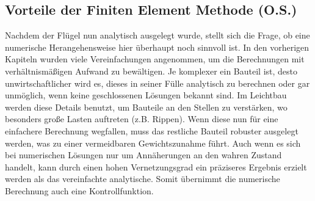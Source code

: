 \subsection{Vorteile der Finiten Element Methode (O.S.)}
Nachdem der Flügel nun analytisch ausgelegt wurde, stellt sich die Frage, ob eine numerische Herangehensweise hier überhaupt noch sinnvoll ist. In den vorherigen Kapiteln wurden viele Vereinfachungen angenommen, um die Berechnungen mit verhältnismäßigen Aufwand zu bewältigen. Je komplexer ein Bauteil ist, desto unwirtschaftlicher wird es, dieses in seiner Fülle analytisch zu berechnen oder gar unmöglich, wenn keine geschlossenen Lösungen bekannt sind. Im Leichtbau werden diese Details benutzt, um Bauteile an den Stellen zu verstärken, wo besonders große Lasten auftreten (z.B. Rippen). Wenn diese nun für eine einfachere Berechnung wegfallen, muss das restliche Bauteil robuster ausgelegt werden, was zu einer vermeidbaren Gewichtszunahme führt. Auch wenn es sich bei numerischen Lösungen nur um Annäherungen an den wahren Zustand handelt, kann durch einen hohen Vernetzungsgrad ein präziseres Ergebnis erzielt werden als das vereinfachte analytische. Somit übernimmt die numerische Berechnung auch eine Kontrollfunktion.
